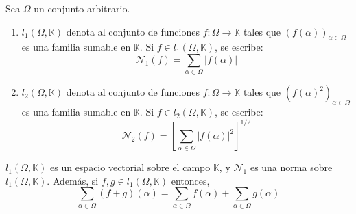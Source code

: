 \documentclass[12pt]{report}
\theoremstyle{largebreak}
\newcommand\cf[3]{\ensuremath{#1:#2\rightarrow#3}}
\newcommand\abs[1]{\ensuremath{\big|#1\big|}}
\begin{document}
    \begin{mydef}
        Sea $\Omega$ un conjunto arbitrario.
        \begin{enumerate}
            \item $l_1(\Omega,\mathbb{K})$ denota al conjunto de funciones $\cf{f}{\Omega}{\mathbb{K}}$ tales que $\left(f(\alpha) \right)_{\alpha\in\Omega}$ es una familia sumable en $\mathbb{K}$. Si $f\in l_1(\Omega,\mathbb{K})$, se escribe:
            \begin{equation*}
                \mathcal{N}_1(f)=\sum_{\alpha\in\Omega }\abs{f(\alpha)}
            \end{equation*}
            \item $l_2(\Omega,\mathbb{K})$ denota al conjunto de funciones $\cf{f}{\Omega}{\mathbb{K}}$ tales que $\left(f(\alpha)^2 \right)_{\alpha\in\Omega}$ es una familia sumable en $\mathbb{K}$. Si $f\in l_2(\Omega,\mathbb{K})$, se escribe:
            \begin{equation*}
                \mathcal{N}_2(f)=\left[\sum_{\alpha\in\Omega }\abs{f(\alpha)}^2\right]^{1/2}
            \end{equation*}
        \end{enumerate}
    \end{mydef}

    \begin{propo}
        $l_1(\Omega,\mathbb{K})$ es un espacio vectorial sobre el campo $\mathbb{K}$, y $\mathcal{N}_1$ es una norma sobre $l_1(\Omega,\mathbb{K})$. Además, si $f,g\in l_1(\Omega,\mathbb{K})$ entonces,
        \begin{equation*}
            \sum_{\alpha\in\Omega }(f+g)(\alpha)=\sum_{\alpha\in\Omega }f(\alpha)+\sum_{\alpha\in\Omega }g(\alpha)
        \end{equation*}
    \end{propo}
\end{document}
